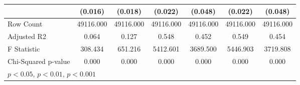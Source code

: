 \begin{table}[htbp]
\begin{tabular}{l*{6}{c}}
                    &     (0.016)         &     (0.018)         &     (0.022)         &     (0.048)         &     (0.022)         &     (0.048)         \\
\hline
Row Count           &   49116.000         &   49116.000         &   49116.000         &   49116.000         &   49116.000         &   49116.000         \\
Adjusted R2         &       0.064         &       0.127         &       0.548         &       0.452         &       0.549         &       0.454         \\
F Statistic         &     308.434         &     651.216         &    5412.601         &    3689.500         &    5446.903         &    3719.808         \\
Chi-Squared p-value &       0.000         &       0.000         &       0.000         &       0.000         &       0.000         &       0.000         \\
\hline\hline
\multicolumn{7}{l}{\footnotesize \sym{*} \(p<0.05\), \sym{**} \(p<0.01\), \sym{***} \(p<0.001\)}\\
\end{tabular}
\end{table}
